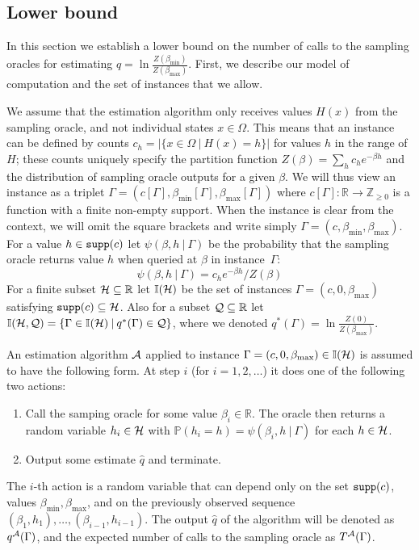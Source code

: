 \documentclass[final,12pt]{colt2018}
\def\bmin{{\beta_{\min}}}
\def\bmax{{\beta_{\max}}}
\def\P{{\mathbb P}}
\def\calA{{\cal A}}
\def\calH{{\cal H}}
\def\calQ{{\cal Q}}
\begin{document}
\subsection{Lower bound}\label{sec:LowerBound}
In this section we establish a lower bound on the number of calls to the sampling oracles
for estimating $q=\ln \frac{Z(\bmin)}{Z(\bmax)}$. First, we describe our model of computation and
the set of instances that we allow.

We assume that the estimation algorithm
only receives  values  $H(x)$ from the sampling oracle, and not individual states $x\in\Omega$.
This means that an instance can be defined by counts
$c_h=|\{x\in\Omega\:|\:H(x)=h\}|$ for values $h$ in the range of $H$; these counts uniquely
specify the partition function $Z(\beta)=\sum_h c_h e^{-\beta h}$
and the distribution of sampling oracle outputs for a given $\beta$.
We will thus view an instance as a triplet $\Gamma=(c[\Gamma],\bmin[\Gamma],\bmax[\Gamma])$
where $c[\Gamma]:\mathbb R\rightarrow\mathbb Z_{\ge 0}$ is a function with a finite non-empty support.
When the instance is clear from the context, we will omit the square brackets and write simply $\Gamma=(c,\bmin,\bmax)$.
For a value $h\in{\tt supp}(c)$ let 
$\psi(\beta,h\:|\:\Gamma)$ be the probability that the sampling oracle returns value $h$ when queried at $\beta$
in instance~$\Gamma$:
$$
\psi(\beta,h\:|\:\Gamma)=c_h e^{-\beta h}/Z(\beta)
$$
For a finite subset $\calH\subseteq\mathbb R$ let $\I(\calH)$ be the set
of instances $\Gamma=(c,0,\bmax)$ satisfying ${\tt supp}(c)\subseteq\calH$.
Also for a subset  $\calQ\subseteq\mathbb R$
let $\I(\calH,\calQ)=\{\Gamma\in\I(\calH)\:|\:q^\ast(\Gamma)\in \calQ\}$,
where we denoted $q^\ast(\Gamma)=\ln \frac{Z(0)}{Z(\bmax)}$.


An estimation algorithm $\calA$ applied to instance $\Gamma=(c,0,\bmax)\in\I(\calH)$ is assumed to have the following form.
At step $i$ (for $i=1,2,\ldots$) it does one of the following two actions:
\begin{enumerate}
\item Call the samping oracle for some value $\beta_i\in\mathbb R$.
The oracle then returns a random variable $h_i\in\calH$ with 
 $\P(h_i=h)=\psi(\beta_i,h\:|\:\Gamma)$
for each $h\in\calH$.
\item Output some  estimate $\hat q$ and terminate.
\end{enumerate}
The $i$-th action is a random variable that can depend only on the set ${\tt supp}(c)$, values $\bmin,\bmax$, and on the previously observed sequence $(\beta_1,h_1),\ldots,(\beta_{i-1},h_{i-1})$.
 The output $\hat q$ of the algorithm will be denoted as $q^{\calA}(\Gamma)$,
and the expected number of calls to the sampling oracle as $T^{\calA}(\Gamma)$.
\end{document}

